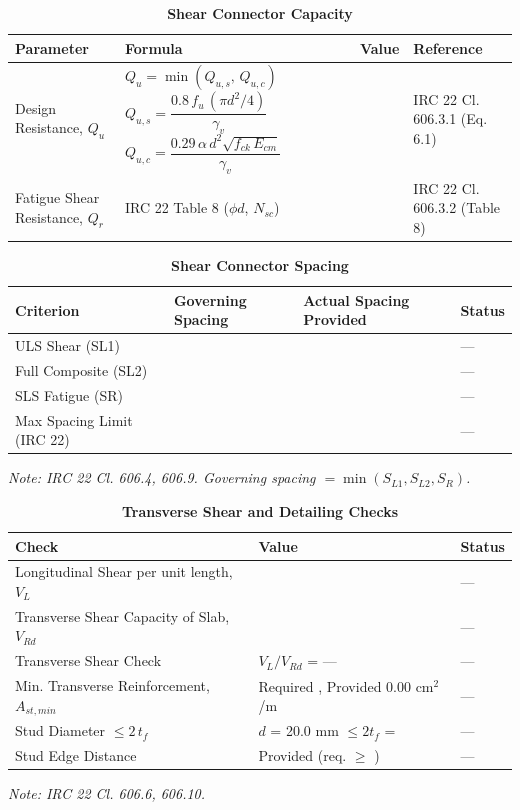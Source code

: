 \documentclass[12pt,a4paper]{report}
\numberwithin{table}{chapter}
\numberwithin{figure}{chapter}
\begin{document}
\begin{longtable}{|L{3.6cm}|C{5.6cm}|>{\centering\arraybackslash}p{2.6cm}|L{3.0cm}|}
\caption{\textbf{Shear Connector Capacity}} \\
\hline
\textbf{Parameter} & \textbf{Formula} & \textbf{Value} & \textbf{Reference} \\[6pt]
\hline
Design Resistance, $Q_u$ & \footnotesize{} &  & IRC 22 Cl. 606.3.1 (Eq. 6.1) \\[6pt]
\hline
Fatigue Shear Resistance, $Q_r$ & IRC 22 Table 8 ($\phi d$, $N_{sc}$) &  & IRC 22 Cl. 606.3.2 (Table 8) \\[6pt]
\hline
\end{longtable}

\vspace{1em}

\setlength\LTleft{0pt}
\setlength\LTright{\fill}

\begin{longtable}{|L{3.2cm}|>{\centering\arraybackslash}p{4.3cm}|>{\centering\arraybackslash}p{4.3cm}|C{2.0cm}|}
\caption{\textbf{Shear Connector Spacing}} \\
\hline
\textbf{Criterion} & \textbf{Governing Spacing} & \textbf{Actual Spacing Provided} & \textbf{Status} \\[6pt]
\hline
ULS Shear (SL1) &  &  & --- \\[6pt]
\hline
Full Composite (SL2) &  &  & --- \\[6pt]
\hline
SLS Fatigue (SR) &  &  & --- \\[6pt]
\hline
Max Spacing Limit (IRC 22) &  &  & --- \\[6pt]
\hline
\end{longtable}
\noindent\textit{Note: IRC 22 Cl. 606.4, 606.9. Governing spacing $= \min(S_{L1}, S_{L2}, S_R)$.}

\vspace{1em}
\begin{longtable}{|L{5.3cm}|>{\arraybackslash}p{7.2cm}|C{2.0cm}|}
\caption{\textbf{Transverse Shear and Detailing Checks}} \\
\hline
\textbf{Check} & \textbf{Value} & \textbf{Status} \\[6pt]
\hline
\textnormal{Longitudinal Shear per unit length, $V_L$} &  & --- \\[6pt]
\hline
\textnormal{Transverse Shear Capacity of Slab, $V_{Rd}$} &  & --- \\[6pt]
\hline
\textnormal{Transverse Shear Check} & $V_L/V_{Rd}$ = --- & --- \\[6pt]
\hline
\textnormal{Min. Transverse Reinforcement, $A_{st,min}$} & Required , Provided 0.00 cm$^2$/m & --- \\[6pt]
\hline
\textnormal{Stud Diameter $\leq 2\,t_f$} & $d$ = 20.0 mm $\leq 2t_f$ =  & --- \\[6pt]
\hline
\textnormal{Stud Edge Distance} & Provided  (req. $\geq$ ) & --- \\[6pt]
\hline
\end{longtable}
\noindent\textit{Note: IRC 22 Cl. 606.6, 606.10.}
\end{document}
